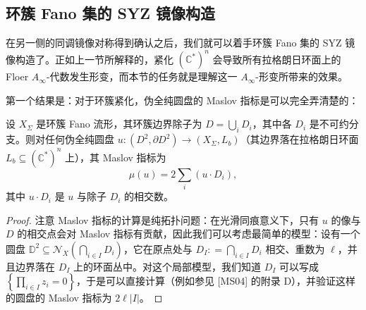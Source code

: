 
\subsection{环簇 Fano 集的 SYZ 镜像构造}

在另一侧的同调镜像对称得到确认之后，我们就可以着手环簇 Fano 集的 SYZ 镜像构造了。正如上一节所解释的，紧化 $\left(\mathbb{C}^{\ast}\right)^n$ 会导致所有拉格朗日环面上的 Floer $A_{\infty}$-代数发生形变，而本节的任务就是理解这一 $A_{\infty}$-形变所带来的效果。


第一个结果是：对于环簇紧化，伪全纯圆盘的 Maslov 指标是可以完全弄清楚的：

\begin{proposition*}[Cho--Oh '06]
设 $X_{\Sigma}$ 是环簇 Fano 流形，其环簇边界除子为 $D=\displaystyle\bigcup_i D_i$，其中各 $D_i$ 是不可约分支。则对任何伪全纯圆盘 $u\colon (D^2,\partial D^2)\to (X_{\Sigma},L_b)$（其边界落在拉格朗日环面 $L_b\subseteq\left(\mathbb{C}^{\ast}\right)^n$ 上），其 Maslov 指标为
\[
  \mu (u)=2\sum_i (u\cdot D_i),
\]
其中 $u\cdot D_i$ 是 $u$ 与除子 $D_i$ 的相交数。
\end{proposition*}


\begin{proof}
注意 Maslov 指标的计算是纯拓扑问题：在光滑同痕意义下，只有 $u$ 的像与 $D$ 的相交点会对 Maslov 指标有贡献，因此我们可以考虑最简单的模型：设有一个圆盘 $\mathbb{D}^2\subseteq\mathcal{N}_X\left(\bigcap_{i\in I} D_i\right)$，它在原点处与 $D_I\colon =\displaystyle\bigcap_{i\in I} D_i$ 相交、重数为 $\ell$，并且边界落在 $D_I$ 上的环面丛中。对这个局部模型，我们知道 $D_I$ 可以写成 $\displaystyle\left\{\prod_{i\in I}z_i=0\right\}$，于是可以直接计算（例如参见 [MS04] 的附录 D），并验证这样的圆盘的 Maslov 指标为 $2\ell\vert I\vert$。
\end{proof}

